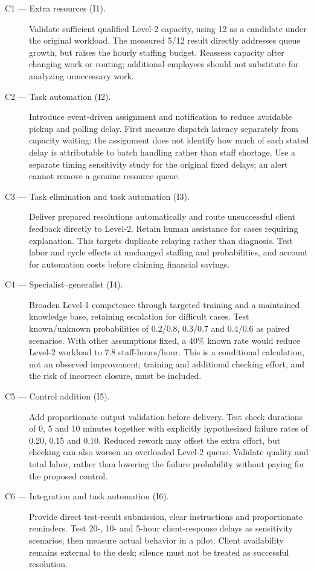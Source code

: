 \documentclass[10pt,a4paper]{article}
\begin{document}
\begin{description}
\item[C1 --- Extra resources (I1).]
Validate sufficient qualified Level-2 capacity, using 12 as a candidate under the
original workload. The measured 5/12 result directly addresses queue growth, but
raises the hourly staffing budget. Reassess capacity after changing work or routing;
additional employees should not substitute for analyzing unnecessary work.

\item[C2 --- Task automation (I2).]
Introduce event-driven assignment and notification to reduce avoidable pickup and
polling delay. First measure dispatch latency separately from capacity waiting:
the assignment does not identify how much of each stated delay is attributable to
batch handling rather than staff shortage. Use a separate timing sensitivity study
for the original fixed delays; an alert cannot remove a genuine resource queue.

\item[C3 --- Task elimination and task automation (I3).]
Deliver prepared resolutions automatically and route unsuccessful client feedback
directly to Level-2. Retain human assistance for cases requiring explanation.
This targets duplicate relaying rather than diagnosis. Test labor and cycle effects
at unchanged staffing and probabilities, and account for automation costs before
claiming financial savings.

\item[C4 --- Specialist--generalist (I4).]
Broaden Level-1 competence through targeted training and a maintained knowledge
base, retaining escalation for difficult cases. Test known/unknown probabilities
of 0.2/0.8, 0.3/0.7 and 0.4/0.6 as paired scenarios. With other assumptions fixed,
a 40\% known rate would reduce Level-2 workload to 7.8 staff-hours/hour. This is a
conditional calculation, not an observed improvement; training and additional
checking effort, and the risk of incorrect closure, must be included.

\item[C5 --- Control addition (I5).]
Add proportionate output validation before delivery. Test check durations of
0, 5 and 10 minutes together with explicitly hypothesized failure rates of
0.20, 0.15 and 0.10. Reduced rework may offset the extra effort, but checking can
also worsen an overloaded Level-2 queue. Validate quality and total labor, rather
than lowering the failure probability without paying for the proposed control.

\item[C6 --- Integration and task automation (I6).]
Provide direct test-result submission, clear instructions and proportionate
reminders. Test 20-, 10- and 5-hour client-response delays as sensitivity scenarios,
then measure actual behavior in a pilot. Client availability remains external to
the desk; silence must not be treated as successful resolution.
\end{description}
\end{document}
